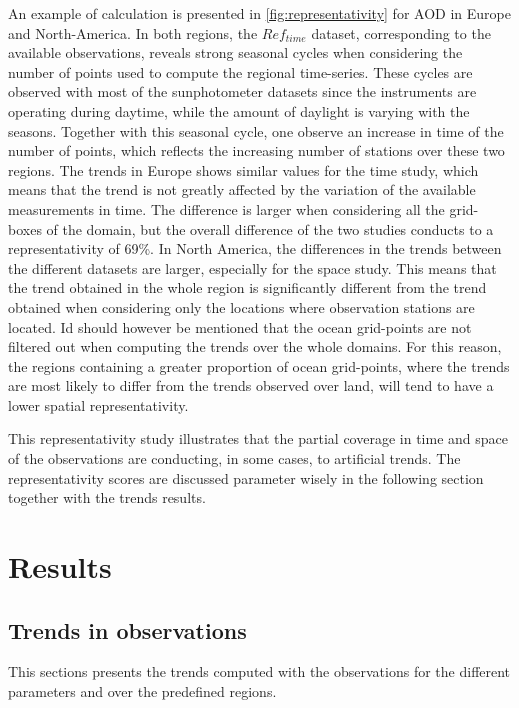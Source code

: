 \documentclass[journal abbreviation, manuscript]{copernicus}
\begin{document}
An example of calculation is presented in \ref{fig:representativity} for AOD in Europe and North-America. In both regions, the $Ref_{time}$ dataset, corresponding to the available observations, reveals strong seasonal cycles when considering the number of points used to compute the regional time-series. These cycles are observed with most of the sunphotometer datasets since the instruments are operating during daytime, while the amount of daylight is varying with the seasons. Together with this seasonal cycle, one observe an increase in time of the number of points, which reflects the increasing number of stations over these two regions. The trends in Europe shows similar values for the time study, which means that the trend is not greatly affected by the variation of the available measurements in time. The difference is larger when considering all the grid-boxes of the domain, but the overall difference of the two studies conducts to a representativity of 69\%. In North America, the differences in the trends between the different datasets are larger, especially for the space study. This means that the trend obtained in the whole region is significantly different from the trend obtained when considering only the locations where observation stations are located. Id should however be mentioned that the ocean grid-points are not filtered out when computing the trends over the whole domains. For this reason, the regions containing a greater proportion of ocean grid-points, where the trends are most likely to differ from the trends observed over land, will tend to have a lower spatial representativity.

This representativity study illustrates that the partial coverage in time and space of the observations are conducting, in some cases, to artificial trends. The representativity scores are discussed parameter wisely in the following section together with the trends results.

\section{Results}

\subsection{Trends in observations}
This sections presents the trends computed with the observations for the different parameters and over the predefined regions.
\end{document}
